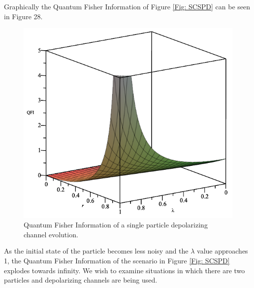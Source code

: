 \documentclass[twocolumn]{article}
\begin{document}
Graphically the Quantum Fisher Information of Figure \ref{Fig: SCSPD} can be seen in Figure 28.
\begin{figure}[ht]
    \centering
    \includegraphics[scale=0.35]{Depolarizing-Single-Channel-QFI.png}
    \caption{\footnotesize{Quantum Fisher Information of a single particle depolarizing channel evolution.}}
    \label{Fig: SCSPDQFI}
\end{figure}
\par \noindent
As the initial state of the particle becomes less noisy and the $\lambda$ value approaches 1, the Quantum Fisher Information of the scenario in Figure \ref{Fig: SCSPD} explodes towards infinity. We wish to examine situations in which there are two particles and depolarizing channels are being used.
\end{document}
